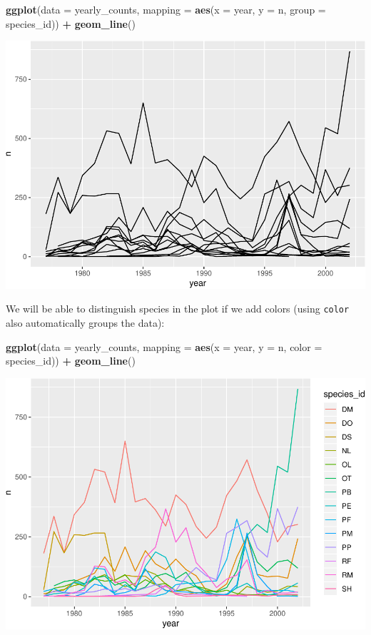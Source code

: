 \documentclass[]{book}
\newenvironment{Shaded}{\begin{snugshade}}{\end{snugshade}}
\newcommand{\KeywordTok}[1]{\textcolor[rgb]{0.13,0.29,0.53}{\textbf{#1}}}
\newcommand{\DataTypeTok}[1]{\textcolor[rgb]{0.13,0.29,0.53}{#1}}
\newcommand{\StringTok}[1]{\textcolor[rgb]{0.31,0.60,0.02}{#1}}
\newcommand{\OperatorTok}[1]{\textcolor[rgb]{0.81,0.36,0.00}{\textbf{#1}}}
\newcommand{\NormalTok}[1]{#1}
\begin{document}
\begin{Shaded}
\begin{Highlighting}[]
\KeywordTok{ggplot}\NormalTok{(}\DataTypeTok{data =}\NormalTok{ yearly_counts, }\DataTypeTok{mapping =} \KeywordTok{aes}\NormalTok{(}\DataTypeTok{x =}\NormalTok{ year, }\DataTypeTok{y =}\NormalTok{ n, }\DataTypeTok{group =}\NormalTok{ species_id)) }\OperatorTok{+}
\StringTok{    }\KeywordTok{geom_line}\NormalTok{()}
\end{Highlighting}
\end{Shaded}

\includegraphics{img/R-ecology-time-series-by-species-1.pdf}

We will be able to distinguish species in the plot if we add colors
(using \texttt{color} also automatically groups the data):

\begin{Shaded}
\begin{Highlighting}[]
\KeywordTok{ggplot}\NormalTok{(}\DataTypeTok{data =}\NormalTok{ yearly_counts, }\DataTypeTok{mapping =} \KeywordTok{aes}\NormalTok{(}\DataTypeTok{x =}\NormalTok{ year, }\DataTypeTok{y =}\NormalTok{ n, }\DataTypeTok{color =}\NormalTok{ species_id)) }\OperatorTok{+}
\StringTok{    }\KeywordTok{geom_line}\NormalTok{()}
\end{Highlighting}
\end{Shaded}

\includegraphics{img/R-ecology-time-series-with-colors-1.pdf}
\end{document}
